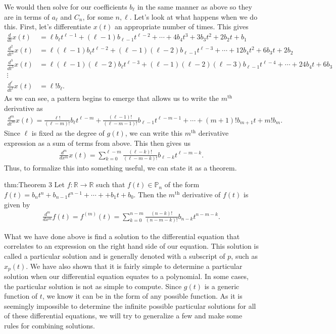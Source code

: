 We would then solve for our coefficients $b_\ell $ in the same manner as above so they are in terms of $a_\ell $ and $C_n$, for some $n, \ell $. Let's look at what happens when we do this.  First, let's differentiate $x(t)$ an appropriate number of times. This gives
\begin{align}
\frac{d}{dt}x(t)&=\ell b_\ell t^{\ell -1}+(\ell -1)b_{\ell -1}t^{\ell -2}+\cdots+4b_4t^3+3b_3t^2+2b_2t+b_1 \\
\frac{d^2}{dt^2}x(t)&=\ell (\ell -1)b_\ell t^{\ell -2}+(\ell -1)(\ell -2)b_{\ell -1}t^{\ell -3}+\cdots+12b_4t^2+6b_3t+2b_2 \\
\frac{d^3}{dt^3}x(t)&=\ell (\ell -1)(\ell -2)b_\ell t^{\ell -3}+(\ell -1)(\ell -2)(\ell -3)b_{\ell -1}t^{\ell -4}+\cdots+24b_4t+6b_3 \\
\vdots \nonumber \\
\frac{d^\ell }{dt^\ell }x(t)&=\ell !b_\ell .
\end{align}
As we can see, a pattern begins to emerge that allows us to write the $m^{\textrm{th}}$ derivative as
\begin{align}
\frac{d^m}{dt^m}x(t)=\frac{\ell !}{(\ell -m)!}b_\ell t^{\ell -m}+\frac{(\ell -1)!}{(\ell -m-1)!}b_{\ell -1}t^{\ell -m-1}+\cdots+(m+1)!b_{m+1}t+m!b_m.
\end{align}
Since $\ell $ is fixed as the degree of $g(t)$, we can write this $m^{\textrm{th}}$ derivative expression as a sum of terms from above. This then gives us
\begin{align}
\frac{d^m}{dx^m}x(t)=\sum_{k=0}^{\ell -m}\frac{(\ell -k)!}{(\ell -m-k)!}b_{\ell -k}t^{\ell -m-k}.
\end{align}
Thus, to formalize this into something useful, we can state it as a theorem.
\begin{theo}{thm:Theorem 3}
	Let $f:\mathbb{R}\rightarrow\mathbb{R}$ such that $f(t)\in\mathbb{P}_n$ of the form $f(t)=b_nt^n+b_{n-1}t^{n-1}+\cdots++b_1t+b_0$. Then the $m^{\textrm{th}}$ derivative of $f(t)$ is given by
	\begin{align*}
	\frac{d^m}{dx^m}f(t)=f^{(m)}(t)=\sum_{k=0}^{n-m}\frac{(n-k)!}{(n-m-k)!}b_{n-k}t^{n-m-k}.
	\end{align*}
\end{theo}
What we have done above is find a solution to the differential equation that correlates to an expression on the right hand side of our equation. This solution is called a particular solution and is generally denoted with a subscript of $p$, such as $x_p(t)$. We have also shown that it is fairly simple to determine a particular solution when our differential equation equates to a polynomial. In some cases, the particular solution is not as simple to compute. Since $g(t)$ is a generic function of $t$, we know it can be in the form of any possible function. As it is seemingly impossible to determine the infinite possible particular solutions for all of these differential equations, we will try to generalize a few and make some rules for combining solutions. 








